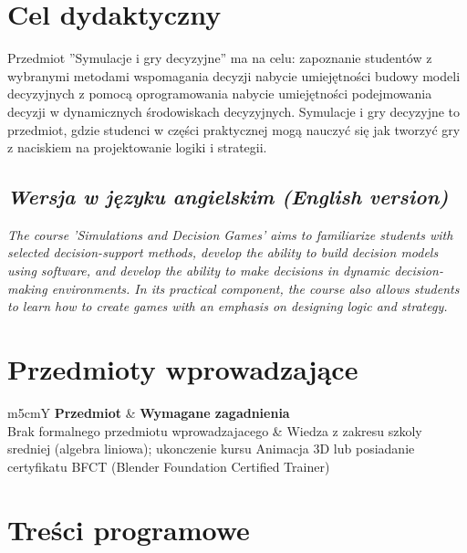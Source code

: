 \documentclass[12pt, a4paper]{article}
\newcommand{\thdrule}{\noalign{\global\setlength{\extrarowheight}{0pt}}}
\newcommand{\thdend}{\noalign{\global\setlength{\extrarowheight}{3pt}}}
\begin{document}
\section{Cel dydaktyczny}

Przedmiot ''Symulacje i gry decyzyjne'' ma na celu: zapoznanie studentów z wybranymi metodami wspomagania decyzji nabycie umiejętności budowy modeli decyzyjnych z pomocą oprogramowania nabycie umiejętności podejmowania decyzji w dynamicznych środowiskach decyzyjnych. Symulacje i gry decyzyjne to przedmiot, gdzie studenci w części praktycznej mogą nauczyć się jak tworzyć gry z naciskiem na projektowanie logiki i strategii.

\subsection*{\textit{Wersja w języku angielskim (English version)}}

\textit{The course 'Simulations and Decision Games' aims to familiarize students with selected decision-support methods, develop the ability to build decision models using software, and develop the ability to make decisions in dynamic decision-making environments. In its practical component, the course also allows students to learn how to create games with an emphasis on designing logic and strategy.}


\section{Przedmioty wprowadzające}

{\scriptsize
\begin{tabularx}{\textwidth}{m{5cm}Y}
\thdrule\toprule
{} {\color{white}\textbf{Przedmiot}} & {\color{white}\textbf{Wymagane zagadnienia}} \\
\midrule\thdend
   Brak formalnego przedmiotu wprowadzajacego & Wiedza z zakresu szkoly sredniej (algebra liniowa); ukonczenie kursu Animacja 3D lub posiadanie certyfikatu BFCT (Blender Foundation Certified Trainer) \\
\bottomrule
\end{tabularx}}

\section{Treści programowe}
\end{document}
